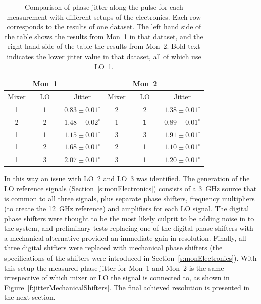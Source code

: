 \begin{table}
  \begin{center}
    \begin{tabular}{|c c c | c c c|}
	   \hline
	   & Mon~1 & & & Mon~2 & \\ \hline
      Mixer & LO & Jitter & Mixer & LO & Jitter \\ \hline
      1 & \textbf{1} & \(\mathbf{0.83\pm0.01^\circ}\) & 2 & 2 & \(1.38\pm0.01^\circ\)    \\
      2 & 2 & \(1.48\pm0.02^\circ\) & 1 & \textbf{1} & \(\mathbf{0.89\pm0.01^\circ}\)    \\ 
      1 & \textbf{1} & \(\mathbf{1.15\pm0.01^\circ}\) & 3 & 3 & \(1.91\pm0.01^\circ\)    \\ 
      1 & 2 & \(1.68\pm0.01^\circ\) & 2 & \textbf{1} & \(\mathbf{1.10\pm0.01^\circ}\)    \\ 
      1 & 3 & \(2.07\pm0.01^\circ\) & 3 & \textbf{1} & \(\mathbf{1.20\pm0.01^\circ}\)    \\  
	\hline
    \end{tabular}
    \caption{Comparison of phase jitter along the pulse for each measurement with different setups of the electronics. Each row corresponds to the results of one dataset. The left hand side of the table shows the results from Mon~1 in that dataset, and the right hand side of the table the results from Mon~2. Bold text indicates the lower jitter value in that dataset, all of which use LO~1.}
  	\label{t:elecSwapResults}
  \end{center}
\end{table}

In this way an issue with LO~2 and LO~3 was identified. The generation of the LO reference signals (Section~\ref{s:monElectronics}) consists of a 3~GHz source that is common to all three signals, plus separate phase shifters, frequency multipliers (to create the 12~GHz reference) and amplifiers for each LO signal. The digital phase shifters were thought to be the most likely culprit to be adding noise in to the system, and preliminary tests replacing one of the digital phase shifters with a mechanical alternative provided an immediate gain in resolution. Finally, all three digital shifters were replaced with mechanical phase shifters (the specifications of the shifters were introduced in Section~\ref{s:monElectronics}). With this setup the measured phase jitter for Mon~1 and Mon~2 is the same irrespective of which mixer or LO the signal is connected to, as shown in Figure~\ref{f:jitterMechanicalShifters}. The final achieved resolution is presented in the next section.



